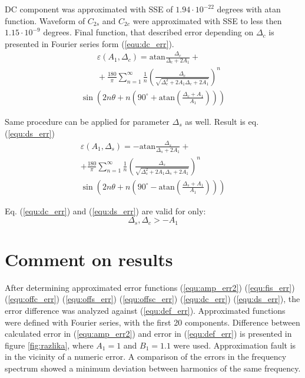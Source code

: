 \documentclass[a4paper]{article}
\begin{document}
DC component was approximated with SSE of $1.94 \cdot 10^{-22}$ degrees with atan function. Waveform of $C_{2s}$ and $C_{2c}$ were approximated with SSE to less then $1.15 \cdot 10^{-9}$ degrees.
Final function, that described error depending on $\Delta_c$ is presented in Fourier series form (\ref{equ:dc_err}).
\begin{multline}
\label{equ:dc_err}
\qquad\varepsilon(A_1, \Delta_c) = \mathrm{atan}\frac{\Delta_c}{\Delta_c+2 A_1}+\\
\qquad+\frac{180}{\pi} \sum_{n=1}^{\infty}\frac{1}{n} (\frac{\Delta_c}{\sqrt{\Delta_c^2+2 A_1 \Delta_c+2 A_1}})^n\\ \sin (2n \theta+n (90^\circ+ \mathrm{ atan}(\frac{\Delta_c+A_1}{A_1})))
\end{multline}

Same procedure can be applied for parameter $\Delta_s$ as well. Result is eq.(\ref{equ:ds_err})
\begin{multline}
\label{equ:ds_err}
\varepsilon(A_1, \Delta_s) = -\mathrm{atan}\frac{\Delta_s}{\Delta_s+2 A_1}+\\+\frac{180}{\pi} \sum_{n=1}^{\infty}\frac{1}{n} (\frac{\Delta_s}{\sqrt{\Delta_s^2+2 A_1 \Delta_s+2A_1}})^n\\ \sin (2n \theta+n (90^\circ- \mathrm{ atan}(\frac{\Delta_s+A_1}{A_1})))
\end{multline}

Eq. (\ref{equ:dc_err}) and (\ref{equ:ds_err}) are valid for only: 
\begin{equation*}
\Delta_s, \Delta_c > -A_1
\end{equation*}

\section{Comment on results}
After determining approximated error functions (\ref{equ:amp_err2}) (\ref{equ:fis_err}) (\ref{equ:offc_err}) (\ref{equ:offs_err}) (\ref{equ:offsc_err}) (\ref{equ:dc_err}) (\ref{equ:ds_err}),
the error difference was analyzed against (\ref{equ:def_err}). Approximated functions were defined with Fourier series, with the first 20 components.
Difference between calculated error in (\ref{equ:amp_err2}) and error in (\ref{equ:def_err})  is presented in figure \ref{fig:razlika}, where $A_1 = 1$ and $B_1 = 1.1$ were used.
Approximation fault is in the vicinity of a numeric error.
A comparison of the errors in the frequency spectrum showed a minimum deviation between harmonics of the same frequency.
\end{document}
